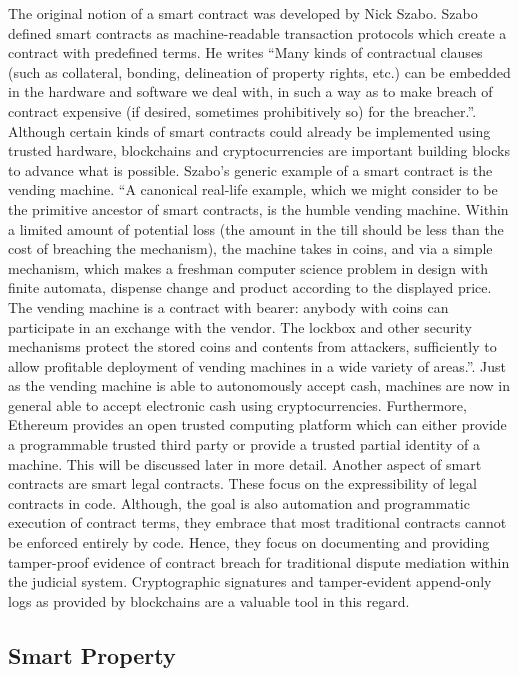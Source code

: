 The original notion of a smart contract was developed by Nick Szabo. Szabo defined smart contracts as machine-readable transaction protocols which create a contract with predefined terms. He writes “Many kinds of contractual clauses (such as collateral, bonding, delineation of property rights, etc.) can be embedded in the hardware and software we deal with, in such a way as to make breach of contract expensive (if desired, sometimes prohibitively so) for the breacher.”.  Although certain kinds of smart contracts could already be implemented using trusted hardware, blockchains and cryptocurrencies are important building blocks to advance what is possible. Szabo’s generic example of a smart contract is the vending machine. 
“A canonical real-life example, which we might consider to be the primitive ancestor of smart contracts, is the humble vending machine. Within a limited amount of potential loss (the amount in the till should be less than the cost of breaching the mechanism), the machine takes in coins, and via a simple mechanism, which makes a freshman computer science problem in design with finite automata, dispense change and product according to the displayed price. The vending machine is a contract with bearer: anybody with coins can participate in an exchange with the vendor. The lockbox and other security mechanisms protect the stored coins and contents from attackers, sufficiently to allow profitable deployment of vending machines in a wide variety of areas.”. Just as the vending machine is able to autonomously accept cash, machines are now in general able to accept electronic cash using cryptocurrencies.  Furthermore, Ethereum provides an open trusted computing platform which can either provide a programmable trusted third party or provide a trusted partial identity of a machine. This will be discussed later in more detail. Another aspect of smart contracts are smart legal contracts. These focus on the expressibility of legal contracts in code. Although, the goal is also automation and programmatic execution of contract terms, they embrace that most traditional contracts cannot be enforced entirely by code. Hence, they focus on documenting and providing tamper-proof evidence of contract breach for traditional dispute mediation within the judicial system. Cryptographic signatures and tamper-evident append-only logs as provided by blockchains are a valuable tool in this regard.

\subsection{Smart Property}
\label{sec:econdev:smartproperty}

